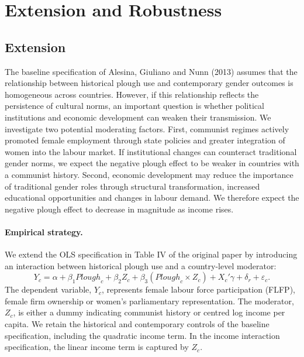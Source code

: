 \documentclass[12pt,a4paper]{article}
\begin{document}
\section{Extension and Robustness}
 \subsection{Extension}

The baseline specification of Alesina, Giuliano and Nunn (2013) assumes that the relationship between historical plough use and contemporary gender outcomes is homogeneous across countries. However, if this relationship reflects the persistence of cultural norms, an important question is whether political institutions and economic development can weaken their transmission. We investigate two potential moderating factors. First, communist regimes actively promoted female employment through state policies and greater integration of women into the labour market. If institutional changes can counteract traditional gender norms, we expect the negative plough effect to be weaker in countries with a communist history. Second, economic development may reduce the importance of traditional gender roles through structural transformation, increased educational opportunities and changes in labour demand. We therefore expect the negative plough effect to decrease in magnitude as income rises.

\paragraph{Empirical strategy.}

We extend the OLS specification in Table IV of the original paper by introducing an interaction between historical plough use and a country-level moderator:
\begin{equation}
    Y_c = \alpha + \beta_1 \mathit{Plough}_c + \beta_2 Z_c
    + \beta_3 (\mathit{Plough}_c \times Z_c)
    + X_c'\gamma + \delta_r + \varepsilon_c.
    \label{eq:extension}
\end{equation}
The dependent variable, $Y_c$, represents female labour force participation (FLFP), female firm ownership or women's parliamentary representation. The moderator, $Z_c$, is either a dummy indicating communist history or centred log income per capita. We retain the historical and contemporary controls of the baseline specification, including the quadratic income term. In the income interaction specification, the linear income term is captured by $Z_c$.
\end{document}

